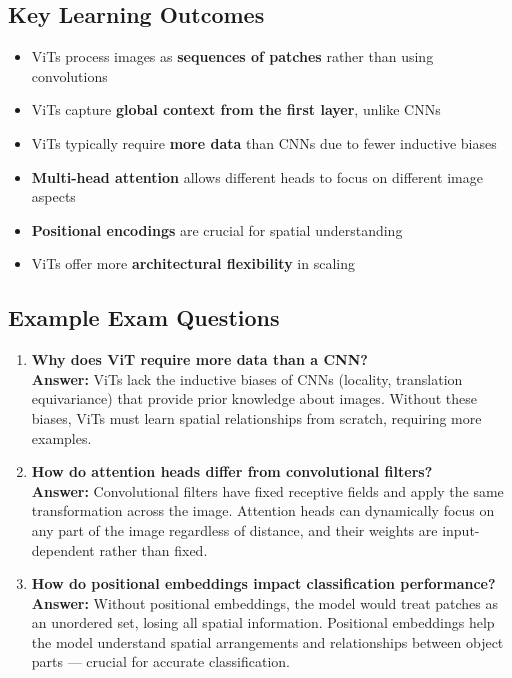 \subsection*{Key Learning Outcomes}
\begin{itemize}
    \item ViTs process images as \textbf{sequences of patches} rather than using convolutions
    \item ViTs capture \textbf{global context from the first layer}, unlike CNNs
    \item ViTs typically require \textbf{more data} than CNNs due to fewer inductive biases
    \item \textbf{Multi-head attention} allows different heads to focus on different image aspects
    \item \textbf{Positional encodings} are crucial for spatial understanding
    \item ViTs offer more \textbf{architectural flexibility} in scaling
\end{itemize}

\subsection*{Example Exam Questions}
\begin{enumerate}
    \item \textbf{Why does ViT require more data than a CNN?} \\
    \textbf{Answer:} ViTs lack the inductive biases of CNNs (locality, translation equivariance) that provide prior knowledge about images. Without these biases, ViTs must learn spatial relationships from scratch, requiring more examples.
    
    \item \textbf{How do attention heads differ from convolutional filters?} \\
    \textbf{Answer:} Convolutional filters have fixed receptive fields and apply the same transformation across the image. Attention heads can dynamically focus on any part of the image regardless of distance, and their weights are input-dependent rather than fixed.
    
    \item \textbf{How do positional embeddings impact classification performance?} \\
    \textbf{Answer:} Without positional embeddings, the model would treat patches as an unordered set, losing all spatial information. Positional embeddings help the model understand spatial arrangements and relationships between object parts --- crucial for accurate classification.
\end{enumerate}
